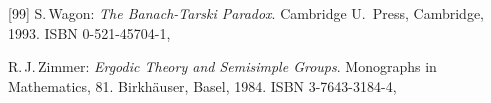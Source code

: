 \begin{references}{[99]}
S.\,Wagon:
\emph{The Banach-Tarski Paradox}. 
Cambridge U.\ Press, Cambridge, 1993. 
ISBN 0-521-45704-1,

R.\,J.\,Zimmer:
\emph{Ergodic Theory and Semisimple Groups}.
Monographs in Mathematics, 81. 
Birkh\"auser, Basel, 1984.
ISBN 3-7643-3184-4,

 \end{references}

